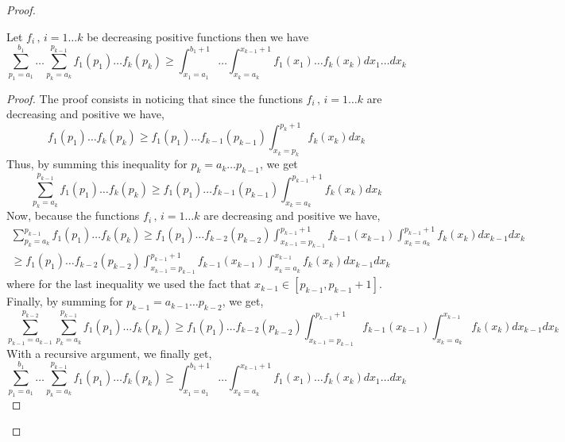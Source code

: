 \begin{proof}
\begin{lemma} 
\label{lemma_two}
Let $f_i \,, \,i = 1 \ldots k$ be decreasing positive functions then we have 
\begin{equation}
    \sum_{p_1=a_1}^{b_1} \ldots \sum_{p_k=a_k}^{p_{k-1}} f_1(p_1) \ldots f_k(p_k)
    \geq \int_{x_1=a_1}^{b_1+1} \ldots \int_{x_k = a_k}^{x_{k-1}+1}  f_1(x_1) \ldots f_k(x_k) dx_1\dots dx_k
\end{equation}
\end{lemma}
\begin{proof}
    The proof consists in noticing that since the functions $f_i \,, \,i = 1 \ldots k$ are decreasing and positive we have, 
    \begin{equation}
        f_1(p_1) \ldots f_k(p_k) \geq  f_1(p_1) \ldots  f_{k-1}(p_{k-1})\int_{x_k = p_k}^{p_k+1} f_k(x_k) dx_k
    \end{equation}
    Thus, by summing this inequality for $p_k= a_k \ldots p_{k-1}$, we get
    \begin{equation}
    \sum_{p_k=a_k}^{p_{k-1}} f_1(p_1) \ldots f_k(p_k)
    \geq  f_1(p_1) \ldots  f_{k-1}(p_{k-1})  \int_{x_k = a_k}^{p_{k-1}+1} f_k(x_k) dx_k
    \end{equation}
    Now, because the functions $f_i \,, \,i = 1 \ldots k$ are decreasing and positive we have, 
     \begin{align}
    \sum_{p_k=a_k}^{p_{k-1}} f_1(p_1) \ldots f_k(p_k)
    \geq  f_1(p_1) \ldots  f_{k-2}(p_{k-2})  \int_{x_{k-1} = p_{k-1}}^{p_{k-1}+1} f_{k-1}(x_{k-1})  \int_{x_k = a_k}^{p_{k-1}+1} f_k(x_k) dx_{k-1}dx_k \\
    \geq f_1(p_1) \ldots  f_{k-2}(p_{k-2})  \int_{x_{k-1} = p_{k-1}}^{p_{k-1}+1} f_{k-1}(x_{k-1})  \int_{x_k = a_k}^{x_{k-1}} f_k(x_k) dx_{k-1}dx_k 
    \end{align}
    where for the last inequality we used the fact that $x_{k-1} \in [p_{k-1}, p_{k-1}+1]$.
    Finally, by summing for $p_{k-1} = a_{k-1} \ldots p_{k-2}$, we get,
    \begin{equation}
    \sum_{p_{k-1}=a_{k-1}}^{p_{k-2}}  \sum_{p_k=a_k}^{p_{k-1}} f_1(p_1) \ldots f_k(p_k)
    \geq f_1(p_1) \ldots  f_{k-2}(p_{k-2})  \int_{x_{k-1} = p_{k-1}}^{p_{k-1}+1} f_{k-1}(x_{k-1})  \int_{x_k = a_k}^{x_{k-1}} f_k(x_k) dx_{k-1}dx_k
    \end{equation}
    With a recursive argument, we finally get,
    \begin{equation}
    \sum_{p_1=a_1}^{b_1} \ldots \sum_{p_k=a_k}^{p_{k-1}} f_1(p_1) \ldots f_k(p_k)
    \geq \int_{x_1=a_1}^{b_1+1} \ldots \int_{x_k = a_k}^{x_{k-1}+1}  f_1(x_1) \ldots f_k(x_k) dx_1\dots dx_k
\end{equation}
\end{proof}

\end{proof}

